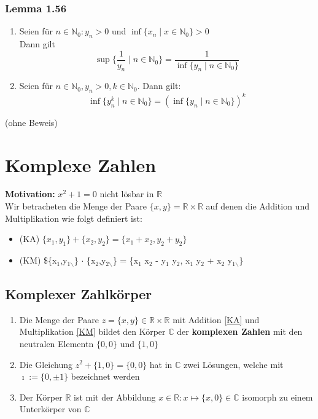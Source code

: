 \documentclass[a4paper]{scrartcl}
\newcommand{\I}{\ensuremath{\imath}}%
\begin{document}
\subsubsection{Lemma 1.56}
\label{sec-2-9-23}
\begin{enumerate}
\item Seien für $n\in \mathbb{N}_0:y_n > 0$ und $\inf \{x_n\mid x\in\mathbb{N}_0\} > 0$ \\
       Dann gilt \[\sup \{\frac{1}{y_n} \mid n\in \mathbb{N}_0\} = \frac{1}{\inf \{y_n \mid n\in\mathbb{N}_0\}}\]
\item \label{1.56.2} Seien für $n\in\mathbb{N}_0,y_n > 0, k\in\mathbb{N}_0$. Dann gilt:
\[\inf \{y_n^k \mid n\in\mathbb{N}_0\} = (\inf \{y_n\mid n\in\mathbb{N}_0\})^k\]
\end{enumerate}
(ohne Beweis)

\section{Komplexe Zahlen}
\label{sec-3}
\textbf{Motivation:} $x^2 + 1 = 0$ nicht lösbar in $\mathbb{R}$ \\
   Wir betracheten die Menge der Paare $\{x,y\} = \mathbb{R}\times\mathbb{R}$ auf denen die Addition und Multiplikation wie folgt definiert ist:
\begin{itemize}
\item \label{KA} (KA) $\{x_1,y_1\} + \{x_2,y_2\} = \{x_1 + x_2, y_2 + y_2\}$
\item \label{KM} (KM) \$\{x$_{\text{1}}$,y$_{\text{1$\backslash$}}$\} $\cdot$ \{x$_{\text{2}}$,y$_{\text{2$\backslash$}}$\} = \{x$_{\text{1}}$ x$_{\text{2}}$ - y$_{\text{1}}$ y$_{\text{2}}$, x$_{\text{1}}$ y$_{\text{2}}$ + x$_{\text{2}}$ y$_{\text{1$\backslash$}}$\}
\end{itemize}
\subsection{Komplexer Zahlkörper}
\label{sec-3-1}
\begin{enumerate}
\item Die Menge der Paare $z = \{x,y\} \in \mathbb{R}\times\mathbb{R}$ mit Addition \ref{KA} und Multiplikation \ref{KM} bildet den Körper $\mathbb{C}$ der \textbf{komplexen Zahlen} mit den neutralen Elementn $\{0,0\}$ und $\{1,0\}$
\item Die Gleichung $z^2 + \{1,0\} = \{0,0\}$ hat in $\mathbb{C}$ zwei Lösungen, welche mit $\I:= \{0,\pm 1\}$ bezeichnet werden
\item Der Körper $\mathbb{R}$ ist mit der Abbildung $x\in\mathbb{R}:x\mapsto\{x,0\}\in\mathbb{C}$ isomorph zu einem Unterkörper von $\mathbb{C}$
\end{enumerate}
\end{document}
